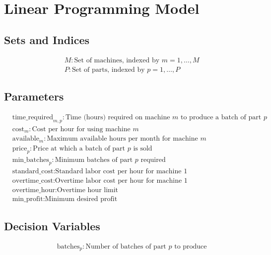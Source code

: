 \documentclass{article}
\begin{document}
\section*{Linear Programming Model}

\subsection*{Sets and Indices}
\begin{align*}
    & M: \text{Set of machines, indexed by } m = 1, \ldots, M \\
    & P: \text{Set of parts, indexed by } p = 1, \ldots, P 
\end{align*}

\subsection*{Parameters}
\begin{align*}
    & \text{time\_required}_{m,p}: \text{Time (hours) required on machine } m \text{ to produce a batch of part } p \\
    & \text{cost}_{m}: \text{Cost per hour for using machine } m \\
    & \text{available}_{m}: \text{Maximum available hours per month for machine } m \\
    & \text{price}_{p}: \text{Price at which a batch of part } p \text{ is sold} \\
    & \text{min\_batches}_{p}: \text{Minimum batches of part } p \text{ required} \\
    & \text{standard\_cost}: \text{Standard labor cost per hour for machine 1} \\
    & \text{overtime\_cost}: \text{Overtime labor cost per hour for machine 1} \\
    & \text{overtime\_hour}: \text{Overtime hour limit}\\
    & \text{min\_profit}: \text{Minimum desired profit}
\end{align*}

\subsection*{Decision Variables}
\begin{align*}
    & \text{batches}_{p}: \text{Number of batches of part } p \text{ to produce} 
\end{align*}
\end{document}
